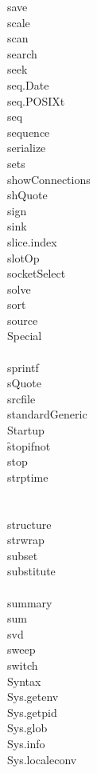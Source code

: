 \documentclass[12pt]{article}
\begin{document}
{save} \\
{scale} \\
{scan} \\
{search} \\
{seek} \\
{seq.Date} \\
{seq.POSIXt} \\
{seq} \\
{sequence} \\
{serialize} \\
{sets} \\
{showConnections} \\
{shQuote} \\
{sign} \\
{sink} \\
{slice.index} \\
{slotOp} \\
{socketSelect} \\
{solve} \\
{sort} \\
{source} \\
{Special} \\
 \\
{sprintf} \\
{sQuote} \\
{srcfile} \\
{standardGeneric} \\
{Startup} \\
\f{stopifnot} \\
{stop} \\
{strptime} \\
 \\
 \\
{structure} \\
{strwrap} \\
{subset} \\
{substitute} \\
 \\
{summary} \\
{sum} \\
{svd} \\
{sweep} \\
{switch} \\
{Syntax} \\
{Sys.getenv} \\
{Sys.getpid} \\
{Sys.glob} \\
{Sys.info} \\
{Sys.localeconv} \\
\end{document}
